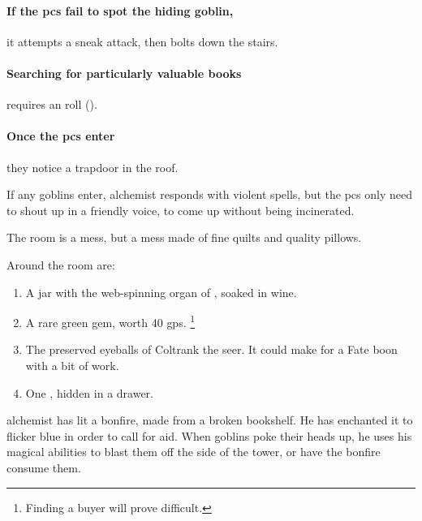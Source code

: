 \begin{multicols}{2}

\paragraph{If the \glspl{pc} fail to spot the hiding goblin,}
it attempts a sneak attack, then bolts down the stairs.

\paragraph{Searching for particularly valuable books}
requires an  roll (\tn[12]).

\paragraph{Once the \glspl{pc} enter}
they notice a trapdoor in the roof.

If any goblins enter, \gls{alchemist} responds with violent spells, but the \glspl{pc} only need to shout up in a friendly voice, to come up without being incinerated.


The room is a mess, but a mess made of fine quilts and quality pillows.

Around the room are:

\begin{enumerate}

  \item{A jar with the web-spinning organ of , soaked in wine.}
  \item{A rare green gem, worth 40 \glspl{gp}.%
  \footnote{Finding a buyer will prove difficult.}}
  \item{The preserved eyeballs of Coltrank the seer.
  It could make  for a Fate \gls{boon} with a bit of work.}
  \item
  One \lootTalisman, hidden in a drawer.

  \showTalisman

\end{enumerate}


\begin{exampletext}
  \Gls{alchemist} has lit a bonfire, made from a broken bookshelf.
  He has enchanted it to flicker blue in order to call for aid.
  When goblins poke their heads up, he uses his magical abilities to blast them off the side of the tower, or have the bonfire consume them.
\end{exampletext}


\end{multicols}
